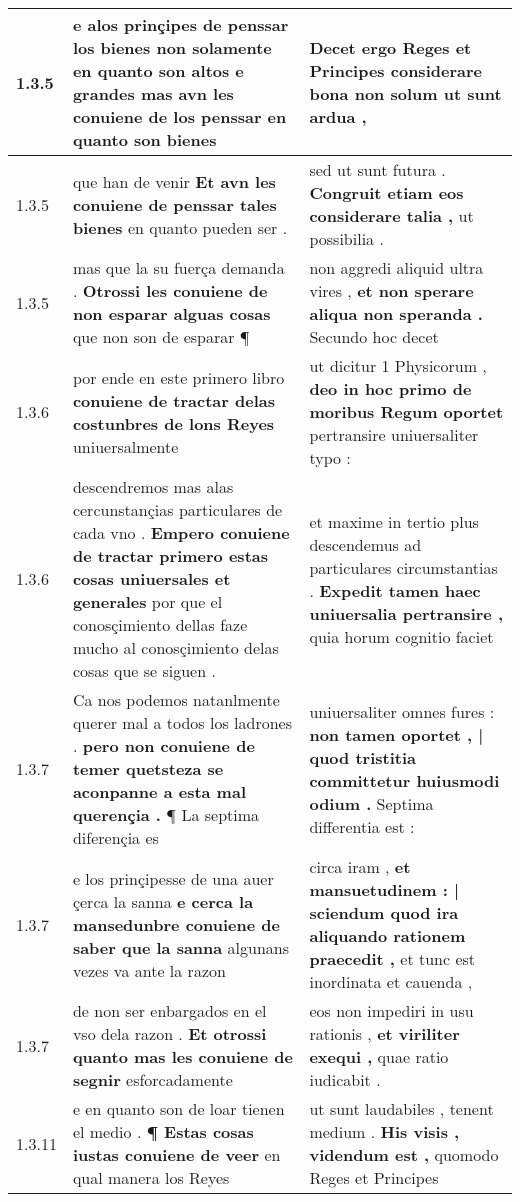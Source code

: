 \begin{tabular}{|p{1cm}|p{6.5cm}|p{6.5cm}|}
1.3.5 & e alos prinçipes de penssar los bienes \textbf{ non solamente en quanto son altos e grandes mas avn les conuiene de los penssar } en quanto son bienes & Decet ergo Reges et Principes \textbf{ considerare bona non solum } ut sunt ardua , \\\hline
1.3.5 & que han de venir \textbf{ Et avn les conuiene de penssar tales bienes } en quanto pueden ser . & sed ut sunt futura . \textbf{ Congruit etiam eos considerare talia , } ut possibilia . \\\hline
1.3.5 & mas que la su fuerça demanda . \textbf{ Otrossi les conuiene de non esparar alguas cosas } que non son de esparar ¶ & non aggredi aliquid ultra vires , \textbf{ et non sperare aliqua non speranda . } Secundo hoc decet \\\hline
1.3.6 & por ende en este primero libro \textbf{ conuiene de tractar delas costunbres de lons Reyes } uniuersalmente & ut dicitur 1 Physicorum , \textbf{ deo in hoc primo de moribus Regum oportet } pertransire uniuersaliter typo : \\\hline
1.3.6 & descendremos mas alas cercunstançias particulares de cada vno . \textbf{ Empero conuiene de tractar primero estas cosas uniuersales et generales } por que el conosçimiento dellas faze mucho al conosçimiento delas cosas que se siguen . & et maxime in tertio plus descendemus ad particulares circumstantias . \textbf{ Expedit tamen haec uniuersalia pertransire , } quia horum cognitio faciet \\\hline
1.3.7 & Ca nos podemos natanlmente querer mal a todos los ladrones . \textbf{ pero non conuiene de temer quetsteza se aconpanne a esta mal querençia . } ¶ La septima diferençia es & uniuersaliter omnes fures : \textbf{ non tamen oportet , | quod tristitia committetur huiusmodi odium . } Septima differentia est : \\\hline
1.3.7 & e los prinçipesse de una auer çerca la sanna \textbf{ e cerca la mansedunbre conuiene de saber que la sanna } algunans vezes va ante la razon & circa iram , \textbf{ et mansuetudinem : | sciendum quod ira aliquando rationem praecedit , } et tunc est inordinata et cauenda , \\\hline
1.3.7 & de non ser enbargados en el vso dela razon . \textbf{ Et otrossi quanto mas les conuiene de segnir } esforcadamente & eos non impediri in usu rationis , \textbf{ et viriliter exequi , } quae ratio iudicabit . \\\hline
1.3.11 & e en quanto son de loar tienen el medio . \textbf{ ¶ Estas cosas iustas conuiene de veer } en qual manera los Reyes & ut sunt laudabiles , tenent medium . \textbf{ His visis , videndum est , } quomodo Reges et Principes \\\hline

\end{tabular}
